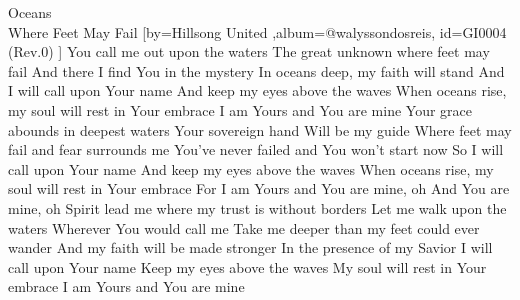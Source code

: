 \beginsong
{Oceans\\Where Feet May Fail %
}[by={Hillsong United  %
},album={@walyssondosreis},
id={GI0004 %
(Rev.0) %
}]
\beginverse
You call me out upon the waters
The great unknown where feet may fail
And there I find You in the mystery
In oceans deep, my faith will stand
\endverse
\beginchorus
And I will call upon Your name
And keep my eyes above the waves
When oceans rise, my soul will rest in Your embrace
I am Yours and You are mine
\endchorus
\beginverse
Your grace abounds in deepest waters
Your sovereign hand
Will be my guide
Where feet may fail and fear surrounds me
You've never failed and You won't start now
\endverse
\beginchorus
So I will call upon Your name
And keep my eyes above the waves
When oceans rise, my soul will rest in Your embrace
For I am Yours and You are mine, oh
And You are mine, oh
\endchorus
\beginverse
Spirit lead me where my trust is without borders
Let me walk upon the waters
Wherever You would call me
Take me deeper than my feet could ever wander
And my faith will be made stronger
In the presence of my Savior
\endverse
\beginchorus
I will call upon Your name
Keep my eyes above the waves
My soul will rest in Your embrace
I am Yours and You are mine
\endchorus

